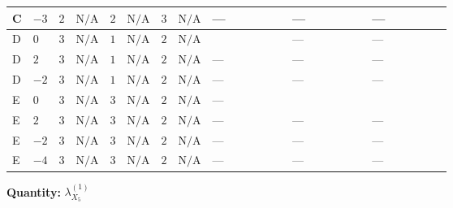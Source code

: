 \documentclass[8pt]{article}
\begin{document}
\begin{landscape}
\begin{longtable}{@{}llcccccc >{\raggedright\arraybackslash}p{0.21\linewidth} >{\raggedright\arraybackslash}p{0.21\linewidth} >{\raggedright\arraybackslash}p{0.21\linewidth}@{}}
\midrule
C & $-3$ & $2$ & $\text{N/A}$ & $2$ & $\text{N/A}$ & $3$ & $\text{N/A}$ & --- & --- & --- \\
\midrule
D & $0$ & $3$ & $\text{N/A}$ & $1$ & $\text{N/A}$ & $2$ & $\text{N/A}$ & \scriptsize\adjustbox{max width=\linewidth}{$\begin{gathered} -4 {\lambda_{S_1}^{(A)}} {\lambda_{X_{5}}^{(1)}}\end{gathered}$} & --- & --- \\
\midrule
D & $2$ & $3$ & $\text{N/A}$ & $1$ & $\text{N/A}$ & $2$ & $\text{N/A}$ & --- & --- & --- \\
\midrule
D & $-2$ & $3$ & $\text{N/A}$ & $1$ & $\text{N/A}$ & $2$ & $\text{N/A}$ & --- & --- & --- \\
\midrule
E & $0$ & $3$ & $\text{N/A}$ & $3$ & $\text{N/A}$ & $2$ & $\text{N/A}$ & --- & \scriptsize\adjustbox{max width=\linewidth}{$\begin{gathered} +8 {\lambda_{X_{6}}} (5 \left({\lambda_{X_{5}}^{(1)}}\right)^{*}+\left({\lambda_{X_{5}}^{(2)}}\right)^{*})\end{gathered}$} & \scriptsize\adjustbox{max width=\linewidth}{$\begin{gathered} +{\lambda_{12}^{(\times)}} (4 {\lambda_{X_{5}}^{(2)}}+4 {\lambda_{X_{9}}})\end{gathered}$} \\
\midrule
E & $2$ & $3$ & $\text{N/A}$ & $3$ & $\text{N/A}$ & $2$ & $\text{N/A}$ & --- & --- & --- \\
\midrule
E & $-2$ & $3$ & $\text{N/A}$ & $3$ & $\text{N/A}$ & $2$ & $\text{N/A}$ & --- & --- & --- \\
\midrule
E & $-4$ & $3$ & $\text{N/A}$ & $3$ & $\text{N/A}$ & $2$ & $\text{N/A}$ & --- & --- & --- \\
\midrule
\bottomrule
\end{longtable}
\clearpage
\noindent\textbf{Quantity: }${\lambda_{X_{5}}^{(1)}}$\par\smallskip

\end{landscape}
\end{document}
